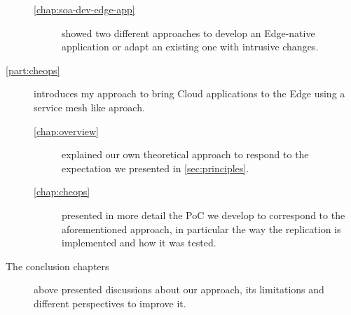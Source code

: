 \begin{description}
\begin{description}
  \item[\autoref{chap:soa-dev-edge-app}] showed two different approaches
    to develop an Edge-native application or adapt an existing one with
    intrusive changes.
  \end{description}
\item [\autoref{part:cheops}] introduces my approach to bring Cloud
  applications to the Edge using a service mesh like aproach.
  \begin{description}
\item[\autoref{chap:overview}] explained our own theoretical approach
  to respond to the expectation we presented in
  \autoref{sec:principles}.
\item[\autoref{chap:cheops}] presented in more detail the PoC we
  develop to correspond to the aforementioned approach, in particular
  the way the replication is implemented and how it was tested.
\end{description}
\item[The conclusion chapters] above presented discussions about our
  approach, its limitations and different perspectives to improve it.
\end{description}
